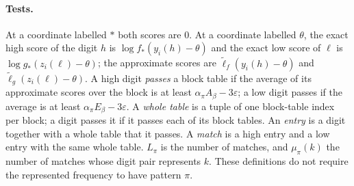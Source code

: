 \documentclass[11pt]{article}
\theoremstyle{definition}
\newcommand{\eps}{\varepsilon}
\begin{document}
\paragraph{Tests.} At a coordinate labelled $\ast$ both scores are $0$. At a coordinate labelled $\theta$, the exact
high score of the digit $h$ is $\log f_\ast(y_i(h)-\theta)$ and the exact low score of $\ell$ is
$\log g_\ast(z_i(\ell)-\theta)$; the approximate scores are $\tilde\ell_f(y_i(h)-\theta)$ and
$\tilde\ell_g(z_i(\ell)-\theta)$. A high digit \emph{passes} a block table if the average of its approximate scores
over the block is at least $\alpha_\pi A_\beta-3\eps$; a low digit passes if the average is at least
$\alpha_\pi E_\beta-3\eps$. A \emph{whole table} is a tuple of one block-table index per block; a digit passes it if it
passes each of its block tables. An \emph{entry} is a digit together with a whole table that it passes. A
\emph{match} is a high entry and a low entry with the same whole table. $L_\pi$ is the number of matches, and
$\mu_\pi(k)$ the number of matches whose digit pair represents $k$. These definitions do not require the represented
frequency to have pattern $\pi$.
\end{document}
